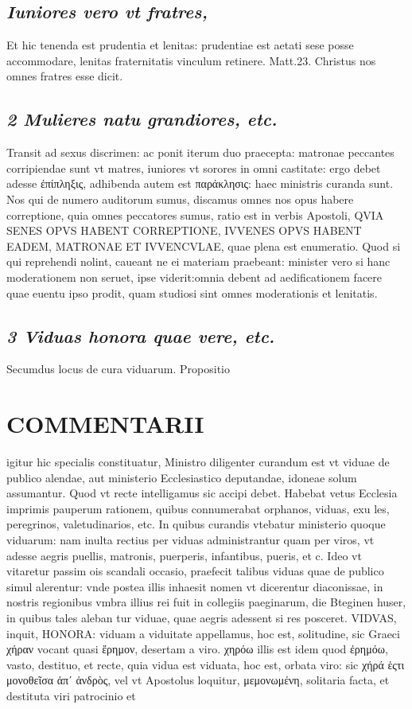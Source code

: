\documentclass{article}
\begin{document}
\begin{pages}
\subsection*{\textit{Iuniores vero vt fratres, }}\pstart Et hic tenenda est prudentia et lenitas: prudentiae est aetati sese posse accommodare, lenitas fraternitatis vinculum retinere. Matt.23. Christus nos omnes fratres esse dicit.  \pend
{}
{}
\subsection*{\textit{2 Mulieres natu grandiores, etc. }}\pstart Transit ad sexus discrimen: ac ponit iterum duo praecepta: matronae peccantes corripiendae sunt vt matres, iuniores vt sorores in omni castitate: ergo debet adesse ἐπίπληξις, adhibenda autem est παράκλησις: haec ministris curanda sunt. Nos qui de numero auditorum sumus, discamus omnes nos opus habere correptione, quia omnes peccatores sumus, ratio est in verbis Apostoli, QVIA SENES OPVS HABENT CORREPTIONE, IVVENES OPVS HABENT EADEM, MATRONAE ET IVVENCVLAE, quae plena est enumeratio. Quod si qui reprehendi nolint, caueant ne ei materiam praebeant: minister vero si hanc moderationem non seruet, ipse viderit:omnia debent ad aedificationem facere quae euentu ipso prodit, quam studiosi sint omnes moderationis et lenitatis.  \pend
{}
{}
\subsection*{\textit{3 Viduas honora quae vere, etc. }}\pstart Secumdus locus de cura viduarum. Propositio  \pend
\section*{COMMENTARII }
\marginpar{[ p.120 ]}\pstart igitur hic specialis constituatur, Ministro diligenter curandum est vt viduae de publico alendae, aut ministerio Ecclesiastico deputandae, idoneae solum assumantur. Quod vt recte intelligamus sic accipi debet. Habebat vetus Ecclesia imprimis pauperum rationem, quibus connumerabat orphanos, viduas, exu les, peregrinos, valetudinarios, etc. In quibus curandis vtebatur ministerio quoque viduarum: nam inulta rectius per viduas administrantur quam per viros, vt adesse aegris puellis, matronis, puerperis, infantibus, pueris, et c. Ideo vt vitaretur passim ois scandali occasio, praefecit talibus viduas quae de publico simul alerentur: vnde postea illis inhaesit nomen vt dicerentur diaconissae, in nostris regionibus vmbra illius rei fuit in collegiis paeginarum, die Bteginen huser, in quibus tales aleban tur viduae, quae aegris adessent si res posceret.  \pend\pstart VIDVAS, inquit, HONORA: viduam a viduitate appellamus, hoc est, solitudine, sic Graeci χήραν vocant quasi ἔρημον, desertam a viro. χηρόω illis est idem quod ἐρημόω, vasto, destituo, et recte, quia vidua est viduata, hoc est, orbata viro: sic χήρά ἑςτι  μονοθεῖσα ἀπʹ ἀνδρὸς, vel vt Apostolus loquitur, μεμονωμένη, solitaria facta, et destituta viri patrocinio et  \pend

\end{pages}
\end{document}
